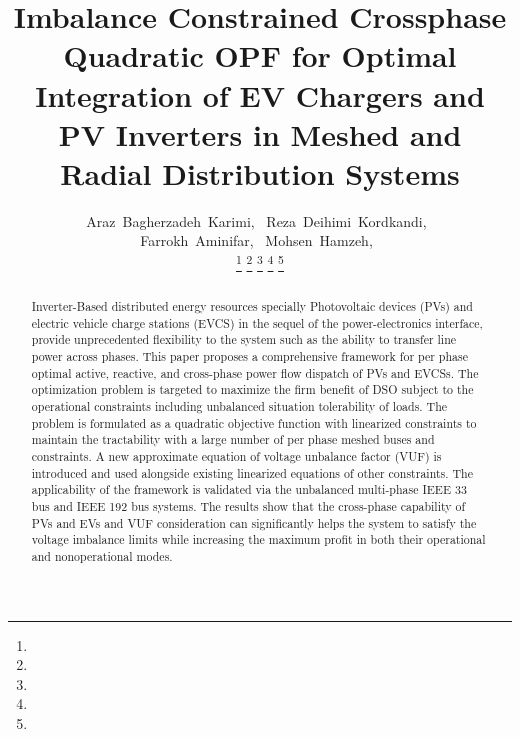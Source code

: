 \documentclass[journal]{IEEEtran}
\begin{document}
    \title{Imbalance Constrained Crossphase Quadratic OPF for Optimal Integration of EV Chargers and PV Inverters in Meshed and Radial Distribution Systems}
  \author{Araz~Bagherzadeh~Karimi,~
      Reza~Deihimi~Kordkandi,~\\
      Farrokh~Aminifar,~
      Mohsen~Hamzeh,~
      

  \thanks{}
  \thanks{}%
  \thanks{}%
  \thanks{}%
  \thanks{}}  




\maketitle

\begin{abstract}

Inverter-Based distributed energy resources specially Photovoltaic devices (PVs) and electric vehicle charge stations (EVCS) in the sequel of the power-electronics interface, provide unprecedented flexibility to the system such as the ability to transfer line power across phases. This paper proposes a comprehensive framework for per phase optimal active, reactive, and cross-phase power flow dispatch of PVs and EVCSs. The optimization problem is targeted to maximize the firm benefit of DSO subject to the operational constraints including unbalanced situation tolerability of loads. The problem is formulated as a quadratic objective function with linearized constraints to maintain the tractability with a large number of per phase meshed buses and constraints. A new approximate equation of voltage unbalance factor (VUF) is introduced and used alongside existing linearized equations of other constraints. The applicability of the framework is validated via the unbalanced multi-phase IEEE 33 bus and IEEE 192 bus systems. The results show that the cross-phase capability of PVs and EVs and VUF consideration can significantly helps the system to satisfy the voltage imbalance limits while increasing the maximum profit in both their operational and nonoperational modes.

\end{abstract}
\end{document}
